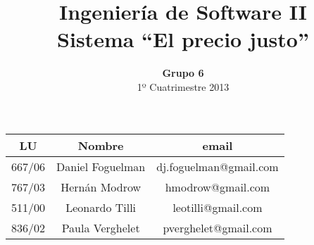\documentclass[a4paper,8pt,spanish]{article}
\title{Ingeniería de Software II\\ \textbf{Sistema ``El precio justo''}}
\author{\textbf{Grupo 6}\\ 1º Cuatrimestre 2013}
\date{}
\begin{document}
\maketitle
\vspace{10cm}
\begin{center}

\begin{tabular}{|c|c|c|}
\hline
\hline
\textbf{LU}&\textbf{Nombre}&\textbf{email}\\
\hline
667/06&Daniel Foguelman &dj.foguelman@gmail.com\\
\hline
767/03&Hernán Modrow&hmodrow@gmail.com\\
\hline
511/00&Leonardo Tilli&leotilli@gmail.com\\
\hline
836/02&Paula Verghelet&pverghelet@gmail.com\\
\hline
\hline
\end{tabular}
\end{center}
\newpage






\end{document}
